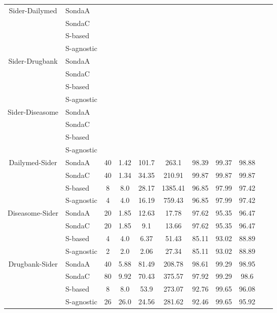 \begin{center}
\begin{table*}[ht]
\begin{tabular}{|c|l|c|c|c|c|c|c|c|c|c|}
\multirow{4}{*}{Sider-Dailymed} & SondaA     \\
											& SondaC  \\
											& S-based  \\
 											& S-agnostic        \\ \hline 		
 																							
\multirow{4}{*}{Sider-Drugbank} & SondaA     \\
											& SondaC  \\
											& S-based \\
 											& S-agnostic      \\ \hline 											

\multirow{4}{*}{Sider-Diseasome} & SondaA      \\
											& SondaC  \\
											& S-based   \\
 											& S-agnostic         \\ \hline 		 									

\multirow{4}{*}{Dailymed-Sider} & SondaA    & 40 & 1.42   & 101.7  & 263.1   & 98.39 & 99.37 & 98.88  \\
											& SondaC  & 40 & 1.34   & 34.35  & 210.91  & 99.87 & 99.87 & 99.87 \\
											& S-based    & 8 & 8.0   & 28.17  & 1385.41  & 96.85 & 97.99 & 97.42\\
 											& S-agnostic    & 4 & 4.0   & 16.19  & 759.43    & 96.85 & 97.99 & 97.42  \\ \hline 		

\multirow{4}{*}{Diseasome-Sider} & SondaA    & 20 & 1.85   & 12.63  & 17.78   & 97.62 & 95.35 & 96.47  \\
											& SondaC   & 20 & 1.85   & 9.1  & 13.66   & 97.62 & 95.35 & 96.47 \\
											& S-based  & 4 & 4.0   & 6.37  & 51.43   & 85.11 & 93.02 & 88.89 \\
 											& S-agnostic    & 2 & 2.0   & 2.06  & 27.34   & 85.11 & 93.02 & 88.89  \\ \hline 		 									

\multirow{4}{*}{Drugbank-Sider} & SondaA    & 40 & 5.88   & 81.49  & 208.78    & 98.61 & 99.29 & 98.95 \\
											& SondaC	   & 80 & 9.92   & 70.43  & 375.57  & 97.92 & 99.29 & 98.6 \\
											& S-based     & 8 & 8.0   & 53.9  & 273.07  & 92.76 & 99.65 & 96.08\\
 											& S-agnostic   & 26 & 26.0   & 24.56  & 281.62   & 92.46 & 99.65 & 95.92 \\ \hline 											 


\end{tabular}
\end{table*}
\end{center}
